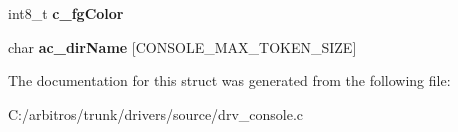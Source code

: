 \begin{DoxyCompactItemize}
\item 
\hypertarget{structt__console_dev_a062d373a04ec81e7297f2b0fc1f91d07}{int8\-\_\-t {\bfseries c\-\_\-fg\-Color}}\label{structt__console_dev_a062d373a04ec81e7297f2b0fc1f91d07}

\item 
\hypertarget{structt__console_dev_aec8faf14e3ad2366f022691be3587617}{char {\bfseries ac\-\_\-dir\-Name} \mbox{[}C\-O\-N\-S\-O\-L\-E\-\_\-\-M\-A\-X\-\_\-\-T\-O\-K\-E\-N\-\_\-\-S\-I\-Z\-E\mbox{]}}\label{structt__console_dev_aec8faf14e3ad2366f022691be3587617}

\end{DoxyCompactItemize}


The documentation for this struct was generated from the following file\-:\begin{DoxyCompactItemize}
\item 
C\-:/arbitros/trunk/drivers/source/drv\-\_\-console.\-c\end{DoxyCompactItemize}
